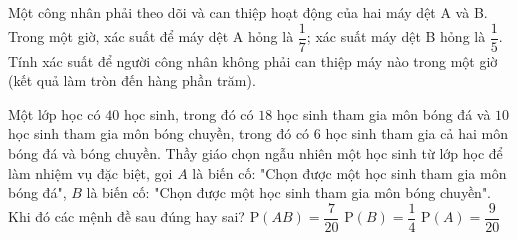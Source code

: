 \begin{bt}%
	Một công nhân phải theo dõi và can thiệp hoạt động của hai máy dệt A và B. Trong một giờ, xác suất để máy dệt A hỏng là $\dfrac{1}{7}$; xác suất máy dệt B hỏng là $\dfrac{1}{5}$. Tính xác suất để người công nhân không phải can thiệp máy nào trong một giờ (kết quả làm tròn đến hàng phần trăm).
\end{bt}

\begin{ex}%
	Một lớp học có $40$ học sinh, trong đó có $18$ học sinh tham gia môn bóng đá và $10$ học sinh tham gia môn bóng chuyền, trong đó có $6$ học sinh tham gia cả hai môn bóng đá và bóng chuyền. Thầy giáo chọn ngẫu nhiên một học sinh từ lớp học để làm nhiệm vụ đặc biệt, gọi $A$ là biến cố: "Chọn được một học sinh tham gia môn bóng đá", $B$ là biến cố: "Chọn được một học sinh tham gia môn bóng chuyền". Khi đó các mệnh đề sau đúng hay sai?
	{$\mathrm{P}(AB)=\dfrac{7}{20}$}
	{\True $\mathrm{P}(B)=\dfrac{1}{4}$}
	{\True $\mathrm{P}(A)=\dfrac{9}{20}$}
\end{ex}

